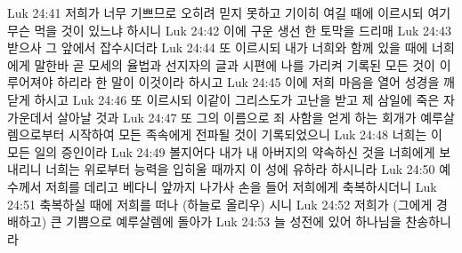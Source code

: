 Luk 24:41  저희가 너무 기쁘므로 오히려 믿지 못하고 기이히 여길 때에 이르시되 여기 무슨 먹을 것이 있느냐 하시니
Luk 24:42  이에 구운 생선 한 토막을 드리매
Luk 24:43  받으사 그 앞에서 잡수시더라
Luk 24:44  또 이르시되 내가 너희와 함께 있을 때에 너희에게 말한바 곧 모세의 율법과 선지자의 글과 시편에 나를 가리켜 기록된 모든 것이 이루어져야 하리라 한 말이 이것이라 하시고
Luk 24:45  이에 저희 마음을 열어 성경을 깨닫게 하시고
Luk 24:46  또 이르시되 이같이 그리스도가 고난을 받고 제 삼일에 죽은 자 가운데서 살아날 것과
Luk 24:47  또 그의 이름으로 죄 사함을 얻게 하는 회개가 예루살렘으로부터 시작하여 모든 족속에게 전파될 것이 기록되었으니
Luk 24:48  너희는 이 모든 일의 증인이라
Luk 24:49  볼지어다 내가 내 아버지의 약속하신 것을 너희에게 보내리니 너희는 위로부터 능력을 입히울 때까지 이 성에 유하라 하시니라
Luk 24:50  예수께서 저희를 데리고 베다니 앞까지 나가사 손을 들어 저희에게 축복하시더니
Luk 24:51  축복하실 때에 저희를 떠나 (하늘로 올리우) 시니
Luk 24:52  저희가 (그에게 경배하고) 큰 기쁨으로 예루살렘에 돌아가
Luk 24:53  늘 성전에 있어 하나님을 찬송하니라



